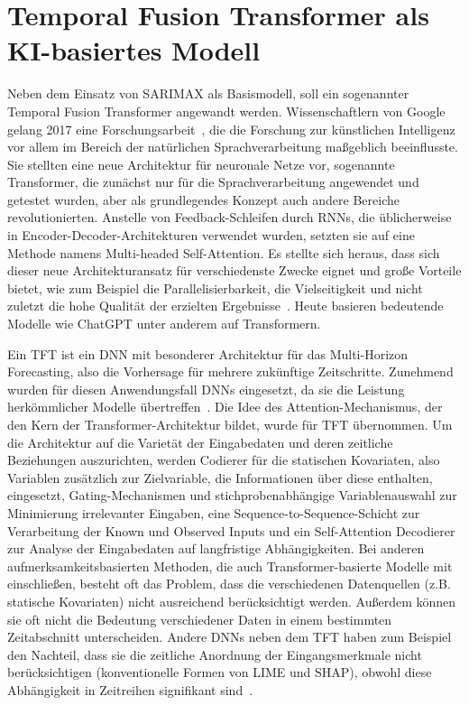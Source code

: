 \section{Temporal Fusion Transformer als KI-basiertes Modell}
Neben dem Einsatz von SARIMAX als Basismodell, soll ein sogenannter Temporal Fusion Transformer angewandt werden.
Wissenschaftlern von Google gelang 2017 eine Forschungsarbeit~\cite{Vaswani.2017}, die die Forschung zur künstlichen Intelligenz vor allem im Bereich der natürlichen Sprachverarbeitung maßgeblich beeinflusste.
Sie stellten eine neue Architektur für neuronale Netze vor, sogenannte Transformer, die zunächst nur für die Sprachverarbeitung angewendet und getestet wurden, aber als grundlegendes Konzept auch andere Bereiche revolutionierten.
Anstelle von Feedback-Schleifen durch \ac{RNN}s, die üblicherweise in Encoder-Decoder-Architekturen verwendet wurden, setzten sie auf eine Methode namens \glqq Multi-headed Self-Attention\grqq{}.
Es stellte sich heraus, dass sich dieser neue Architekturansatz für verschiedenste Zwecke eignet und große Vorteile bietet, wie zum Beispiel die Parallelisierbarkeit, die Vielseitigkeit und nicht zuletzt die hohe Qualität der erzielten Ergebnisse~\cite{Vaswani.2017}.
Heute basieren bedeutende Modelle wie ChatGPT unter anderem auf Transformern.

Ein \ac{TFT} ist ein \ac{DNN} mit besonderer Architektur für das Multi-Horizon Forecasting, also die Vorhersage für mehrere zukünftige Zeitschritte.
Zunehmend wurden für diesen Anwendungsfall \ac{DNN}s eingesetzt, da sie die Leistung herkömmlicher Modelle übertreffen~\cite{Lim.19.12.2019}.
Die Idee des Attention-Mechanismus, der den Kern der Transformer-Architektur bildet, wurde für \ac{TFT} übernommen.
Um die Architektur auf die Varietät der Eingabedaten und deren zeitliche Beziehungen auszurichten, werden Codierer für die statischen Kovariaten, also Variablen zusätzlich zur Zielvariable, die Informationen über diese enthalten, eingesetzt, Gating-Mechanismen und stichprobenabhängige Variablenauswahl zur Minimierung irrelevanter Eingaben, eine Sequence-to-Sequence-Schicht zur Verarbeitung der Known und Observed Inputs und ein Self-Attention Decodierer zur Analyse der Eingabedaten auf langfristige Abhängigkeiten.
Bei anderen aufmerksamkeitsbasierten Methoden, die auch Transformer-basierte Modelle mit einschließen, besteht oft das Problem, dass die verschiedenen Datenquellen (z.B. statische Kovariaten) nicht ausreichend berücksichtigt werden.
Außerdem können sie oft nicht die Bedeutung verschiedener Daten in einem bestimmten Zeitabschnitt unterscheiden.
Andere \ac{DNN}s neben dem \ac{TFT} haben zum Beispiel den Nachteil, dass sie die zeitliche Anordnung der Eingangsmerkmale nicht berücksichtigen (konventionelle Formen von LIME und SHAP), obwohl diese Abhängigkeit in Zeitreihen signifikant sind~\cite{Lim.19.12.2019}.

